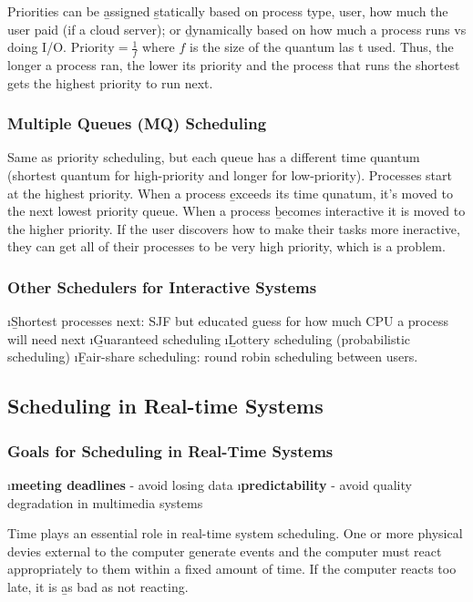 \documentclass{article}
\begin{document}
    \noindent Priorities can be \b{assigned} \b{statically} based on process type, user, how much the user paid (if a cloud server); or \b{dynamically} based on how much a process runs vs doing I/O. $\textrm{Priority} = \frac{1}{f}$ where $f$ is the size of the quantum las t used. Thus, the longer a process ran, the lower its priority and the process that runs the shortest gets the highest priority to run next.

    \subsubsection{Multiple Queues (MQ) Scheduling}

    Same as priority scheduling, but each queue has a different time quantum (shortest quantum for high-priority and longer for low-priority). Processes start at the highest priority. When a process \b{exceeds} its time qunatum, it's moved to the next lowest priority queue. When a process \b{becomes interactive} it is moved to the higher priority. If the user discovers how to make their tasks more ineractive, they can get all of their processes to be very high priority, which is a problem. 

    \subsubsection{Other Schedulers for Interactive Systems}

    \bl 
    \i \b{Shortest processes next}: SJF but educated guess for how much CPU a process will need next
    \i \b{Guaranteed scheduling}
    \i \b{Lottery scheduling} (probabilistic scheduling)
    \i \b{Fair-share scheduling}: round robin scheduling between users. 
    \el

\subsection{Scheduling in Real-time Systems}
    
    \subsubsection{Goals for Scheduling in Real-Time Systems}

    \bl
    \i \textbf{meeting deadlines} - avoid losing data
    \i \textbf{predictability} - avoid quality degradation in multimedia systems
    \el

    \noindent Time plays an essential role in real-time system scheduling. One or more physical devies external to the computer generate events and the computer must react appropriately to them within a fixed amount of time. If the computer reacts too late, it is \b{as bad as not reacting}. \\
\end{document}
